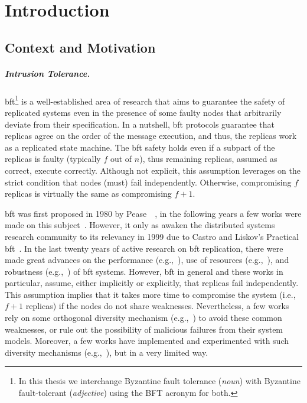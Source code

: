 \chapter{Introduction}
\label{chap:introduction}

\section{Context and Motivation}
\paragraph{Intrusion Tolerance.}
\gls{bft}\footnote{In this thesis we interchange Byzantine fault tolerance (\emph{noun}) with Byzantine fault-tolerant (\emph{adjective}) using the BFT acronym for both.} is a well-established area of research that aims to guarantee the safety of replicated systems even in the presence of some faulty nodes that arbitrarily deviate from their specification.
In a nutshell, \gls{bft} protocols guarantee that replicas agree on the order of the message execution, and thus, the replicas work as a replicated state machine.
The \gls{bft} safety holds even if a subpart of the replicas is faulty (typically $f$ out of $n$), thus remaining replicas, assumed as correct, execute correctly.
Although not explicit, this assumption leverages on the strict condition that nodes (must) fail independently.
Otherwise, compromising $f$ replicas is virtually the same as compromising $f+1$.


\gls{bft} was first proposed in 1980 by Pease~\etal{}~\cite{Pease:1980}, in the following years a few works were made on this subject~\cite{Reiter:1994,Kihlstrom:1998}.
However, it only as awaken the distributed systems research community to its relevancy in 1999 due to Castro and Liskov's Practical \gls{bft}~\cite{Castro:1999}. 
In the last twenty years of active research on \gls{bft} replication, there were made great advances on the performance (e.g.,~\cite{Kotla:2010,Aublin:2015,Behl:2015}), use of resources (e.g.,~\cite{Yin:2003,Wood:2011,Veronese:2013,Liu:2016,Behl:2017}), and robustness (e.g.,~\cite{Amir:2011,Bessani:2014,Clement:2009b}) of \gls{bft} systems.
However, \gls{bft} in general and these works in particular, assume, either implicitly or explicitly, that replicas fail independently. 
This assumption implies that it takes more time to compromise the system (i.e., $f+1$ replicas) if the nodes do not share weaknesses. 
Nevertheless, a few works rely on some orthogonal diversity mechanism (e.g.,~\cite{Roeder:2010,Avizienis:1995}) to avoid these common weaknesses, or rule out the possibility of malicious failures from their system models.
Moreover, a few works have implemented and experimented with such diversity mechanisms (e.g.,~\cite{Castro:2003,Roeder:2010,Amir:2011}), but in a very limited way.


